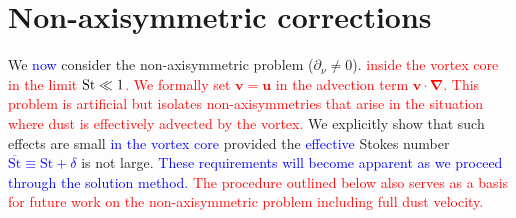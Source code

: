 \documentclass[apj]{emulateapj}
\renewcommand{\v}[1]{{\boldsymbol{#1}}} %
\def\blue#1{\textcolor{blue}{#1}}
\def\red#1{\textcolor{red}{#1}}
\newcommand{\del}{\v{\nabla}}
\newcommand{\grad}{\del}
\newcommand{\Fig}[1]{Fig.~\ref{#1}}
\newcommand{\fig}[1]{\Fig{#1}}
\newcommand{\beq}{\begin{equation}}
\newcommand{\eeq}{\end{equation}}
\newcommand{\St}{{\rm St}}
\begin{document}
%


\section{Non-axisymmetric corrections}
\label{sect:nonaxisymmetric} 

We \blue{now} consider the non-axisymmetric problem ($\partial_\nu\neq0$)\blue{.} 
\red{inside the vortex core in the limit $\St \ll 1$. We formally set $\v{v} = \v{u}$ in the advection term 
$\v{v}\cdot\del$. This problem is artificial but isolates non-axisymmetries that arise in the 
situation where dust is effectively advected by the vortex.} We explicitly show that such effects are small 
\blue{in the vortex core} provided the \blue{effective} Stokes number \blue{$\overline{\mathrm{St}}\equiv\mathrm{St}+\delta$} is not large. \blue{These requirements will become
apparent as we proceed through the solution method.} \red{The procedure outlined below also serves as a basis for future 
work on the non-axisymmetric problem including full dust velocity.}
\end{document}
